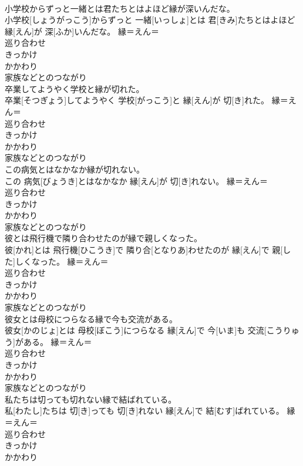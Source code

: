 \documentclass[8pt]{extreport}
\begin{document}
\begin{CJK}{UTF8}{min}
{\\	小学校からずっと一緒とは君たちとはよほど縁が深いんだな。	
\\	小学校[しょうがっこう]からずっと 一緒[いっしょ]とは 君[きみ]たちとはよほど 縁[えん]が 深[ふか]いんだな。	縁＝えん＝ 
\\	巡り合わせ
\\	きっかけ
\\	かかわり
\\	家族などとのつながり
\\	卒業してようやく学校と縁が切れた。	
\\	卒業[そつぎょう]してようやく 学校[がっこう]と 縁[えん]が 切[き]れた。	縁＝えん＝ 
\\	巡り合わせ
\\	きっかけ
\\	かかわり
\\	家族などとのつながり
\\	この病気とはなかなか縁が切れない。	
\\	この 病気[びょうき]とはなかなか 縁[えん]が 切[き]れない。	縁＝えん＝ 
\\	巡り合わせ
\\	きっかけ
\\	かかわり
\\	家族などとのつながり
\\	彼とは飛行機で隣り合わせたのが縁で親しくなった。	
\\	彼[かれ]とは 飛行機[ひこうき]で 隣り合[となりあ]わせたのが 縁[えん]で 親[した]しくなった。	縁＝えん＝ 
\\	巡り合わせ
\\	きっかけ
\\	かかわり
\\	家族などとのつながり
\\	彼女とは母校につらなる縁で今も交流がある。	
\\	彼女[かのじょ]とは 母校[ぼこう]につらなる 縁[えん]で 今[いま]も 交流[こうりゅう]がある。	縁＝えん＝ 
\\	巡り合わせ
\\	きっかけ
\\	かかわり
\\	家族などとのつながり
\\	私たちは切っても切れない縁で結ばれている。	
\\	私[わたし]たちは 切[き]っても 切[き]れない 縁[えん]で 結[むす]ばれている。	縁＝えん＝ 
\\	巡り合わせ
\\	きっかけ
\\	かかわり
}
\end{CJK}
\end{document}
